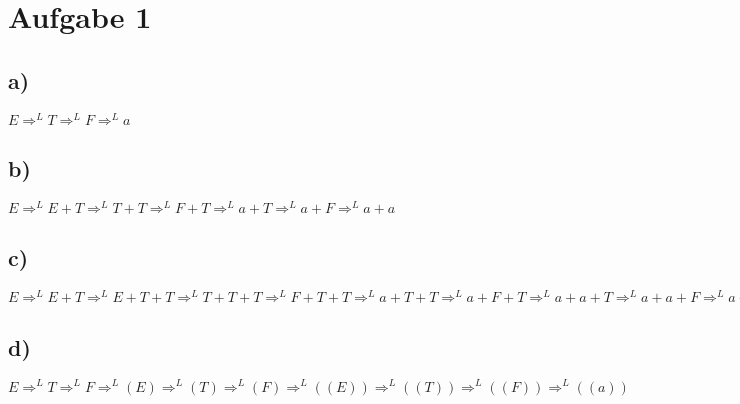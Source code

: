 \section*{Aufgabe 1}

\subsection*{a)}
$ E \Rightarrow^L T \Rightarrow^L F \Rightarrow^L a $
\subsection*{b)}
$ E \Rightarrow^L E+T \Rightarrow^L T+T \Rightarrow^L F+T \Rightarrow^L a+T \Rightarrow^L a+F \Rightarrow^L a+a $
\subsection*{c)}
$ E \Rightarrow^L E+T \Rightarrow^L E+T+T \Rightarrow^L  T+T+T \Rightarrow^L  F+T+T \Rightarrow^L  a+T+T \Rightarrow^L  a+F+T \Rightarrow^L a+a+T \Rightarrow^L a+a+F \Rightarrow^L a+a+a $
\subsection*{d)}
$ E \Rightarrow^L T \Rightarrow^L F \Rightarrow^L (E)  \Rightarrow^L (T) \Rightarrow^L (F) \Rightarrow^L ((E)) \Rightarrow^L ((T)) \Rightarrow^L ((F)) \Rightarrow^L ((a)) $
